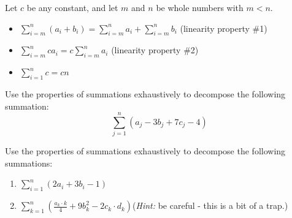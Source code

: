 \documentclass[10pt]{article}
\begin{document}
\newpage

{
Let $c$ be any constant, and let $m$ and $n$ be whole numbers with $m<n$.
\begin{itemize}
\item $\displaystyle\sum_{i=m}^n(a_i+b_i) = \sum_{i=m}^n a_i + \sum_{i=m}^n b_i$ \hfill (linearity property \#1)
\item $\displaystyle\sum_{i=m}^n ca_i = c\sum_{i=m}^n a_i$  \hfill (linearity property \#2)
\item $\displaystyle\sum_{i=1}^n c = cn$
\end{itemize}
}

{\example} Use the properties of summations exhaustively to decompose the following summation: \[\sum_{j=1}^n (a_j-3b_j+7c_j-4)\]

    \vfill
    
{\exercise} Use the properties of summations exhaustively to decompose the following summations:
    \begin{enumerate}
    \item[(a)] $\displaystyle\sum_{i=1}^n (2a_i+3b_i-1)$
        \vfill
    \item[(b)] $\displaystyle\sum_{k=1}^n \left(\frac{a_k\cdot k}4+9b_k^2-2c_k\cdot d_k\right)$\quad(\emph{Hint:} be careful - this is a bit of a trap.)
        \vfill
    \end{enumerate}
\end{document}
